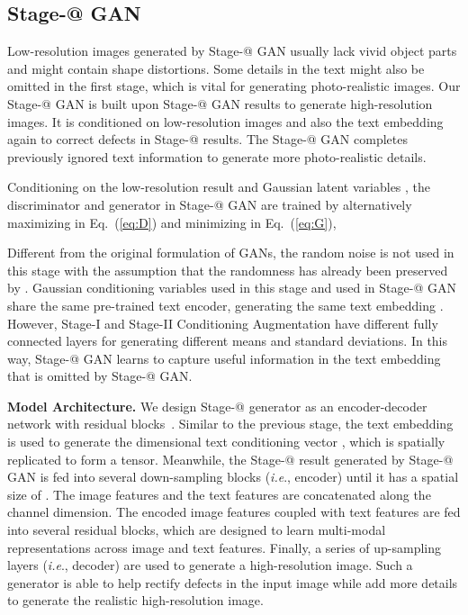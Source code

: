 \documentclass[10pt,journal,letterpaper,compsoc]{IEEEtran}
\makeatletter
\newcommand{\Rmnum}[1]{\expandafter\@slowromancap\romannumeral #1@}
\makeatother
\begin{document}
\subsection{Stage-\Rmnum{2} GAN} 
Low-resolution images generated by Stage-\Rmnum{1} GAN usually lack vivid object parts and might contain shape distortions. Some details in the text might also be omitted in the first stage, which is vital for generating photo-realistic images.  
Our Stage-\Rmnum{2} GAN is built upon Stage-\Rmnum{1} GAN results to generate high-resolution images. 
It is conditioned on low-resolution images and also the text embedding again to correct defects in Stage-\Rmnum{1} results. The Stage-\Rmnum{2} GAN completes previously ignored text information to generate more photo-realistic details.


Conditioning on the low-resolution result  and Gaussian latent variables , the discriminator  and generator  in Stage-\Rmnum{2} GAN are trained by alternatively maximizing  in Eq.~(\ref{eq:D}) and minimizing  in Eq.~(\ref{eq:G}), 


Different from the original formulation of GANs, the random noise  is not used in this stage with the assumption that the randomness has already been preserved by . Gaussian conditioning variables  used in this stage and  used in Stage-\Rmnum{1} GAN share the same pre-trained text encoder, generating the same text embedding . However, Stage-I and Stage-II Conditioning Augmentation have different fully connected layers for generating different means and standard deviations. In this way, Stage-\Rmnum{2} GAN learns to capture useful information in the text embedding that is omitted by Stage-\Rmnum{1} GAN.


\textbf{Model Architecture. }
We design Stage-\Rmnum{2} generator as an encoder-decoder network with residual blocks~\cite{HeZRS15}. 
Similar to the previous stage, the text embedding  is used to generate the  dimensional text conditioning vector , which is spatially replicated to form a  tensor. 
Meanwhile, the Stage-\Rmnum{1} result  generated by Stage-\Rmnum{1} GAN is fed into several down-sampling blocks (\emph{i.e}., encoder) until it has a spatial size of . The image features and the text features are concatenated along the channel dimension. 
The encoded image features coupled with text features are fed into several residual blocks, which are designed to learn multi-modal representations across image and text features. 
Finally, a series of up-sampling layers (\emph{i.e}., decoder) are used to generate a  high-resolution image. Such a generator is able to help rectify defects in the input image while add more details to generate the realistic high-resolution image.
\end{document}
